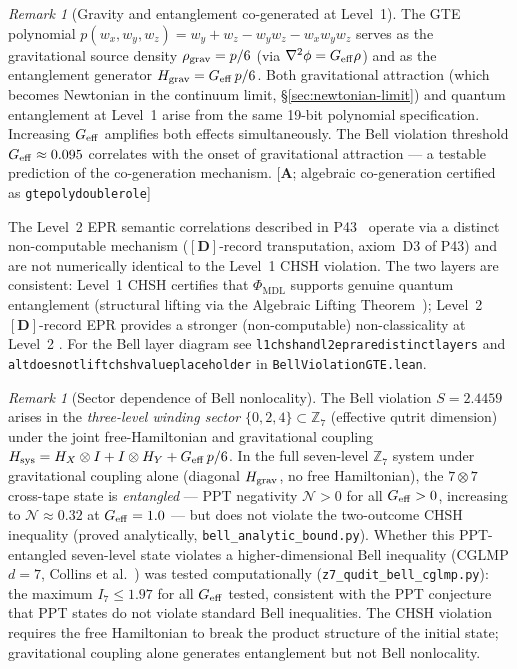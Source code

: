 \documentclass[11pt]{article}
\theoremstyle{remark}
\newtheorem{remark}[theorem]{Remark}
\newcommand{\PHIMDL}{\Phi_{\mathrm{MDL}}}
\newcommand{\lean}[1]{%
  \penalty-100
  \begingroup\def\_{\textunderscore\allowbreak}\texttt{#1}\endgroup}
\newcommand{\CatA}{\textbf{A}}
\begin{document}
\begin{remark}[Gravity and entanglement co-generated at Level~1]
The GTE polynomial $p(w_x, w_y, w_z) = w_y + w_z - w_yw_z - w_xw_yw_z$ serves as
the gravitational source density $\rho_{\rm grav} = p/6$ (via $\nabla^2\phi = G_{\rm eff}\rho$)
and as the entanglement generator $H_{\rm grav} = G_{\rm eff}\,p/6$.
Both gravitational attraction (which becomes Newtonian in the continuum limit,
\S\ref{sec:newtonian-limit}) and quantum entanglement at Level~1 arise from the same 19-bit
polynomial specification.  Increasing $G_{\rm eff}$ amplifies both effects simultaneously.
The Bell violation threshold $G_{\rm eff} \approx 0.095$ correlates with the onset
of gravitational attraction --- a testable prediction of the co-generation mechanism.
[$\CatA$; algebraic co-generation certified as \lean{gte\_poly\_double\_role}]

The Level~2 EPR semantic correlations described in P43~\cite{SpivackCompleteness}
operate via a distinct non-computable mechanism ($[\mathbf{D}]$-record transputation,
axiom~D3 of P43) and are not numerically identical to the Level~1 CHSH violation.
The two layers are consistent: Level~1 CHSH certifies that $\PHIMDL$ supports genuine
quantum entanglement (structural lifting via the Algebraic Lifting Theorem~\cite{SpivackCompUniversality,SpivackCMCA,SpivackPhiMDLField}); Level~2
$[\mathbf{D}]$-record EPR provides a stronger (non-computable) non-classicality at Level~2
\cite{SpivackCompleteness}.  For the Bell layer diagram see
\lean{l1\_chsh\_and\_l2\_epr\_are\_distinct\_layers} and \lean{alt\_does\_not\_lift\allowbreak\_chsh\_value\_placeholder}
in \lean{BellViolationGTE.lean}.
\end{remark}

\begin{remark}[Sector dependence of Bell nonlocality]
The Bell violation $S = 2.4459$ arises in the \emph{three-level winding sector}
$\{0,2,4\}\subset\mathbb{Z}_7$ (effective qutrit dimension) under the joint
free-Hamiltonian and gravitational coupling
$H_{\rm sys} = H_X\otimes I + I\otimes H_Y + G_{\rm eff}\,p/6$.
In the full seven-level $\mathbb{Z}_7$ system under gravitational coupling alone
(diagonal $H_{\rm grav}$, no free Hamiltonian), the $7\otimes 7$ cross-tape state is
\emph{entangled} --- PPT negativity $\mathcal{N} > 0$ for all $G_{\rm eff} > 0$, increasing
to $\mathcal{N} \approx 0.32$ at $G_{\rm eff} = 1.0$ --- but does not violate the two-outcome
CHSH inequality (proved analytically, \texttt{bell\_analytic\_bound.py}).
Whether this PPT-entangled seven-level state violates a higher-dimensional Bell inequality
(CGLMP $d=7$, Collins et al.~\cite{Collins2002}) was tested computationally
(\texttt{z7\_qudit\_bell\_cglmp.py}):
the maximum $I_7 \leq 1.97$ for all $G_{\rm eff}$ tested, consistent with the PPT
conjecture that PPT states do not violate standard Bell inequalities.
The CHSH violation requires the free Hamiltonian to break the product structure of the
initial state; gravitational coupling alone generates entanglement but not Bell nonlocality.
\end{remark}
\end{document}
